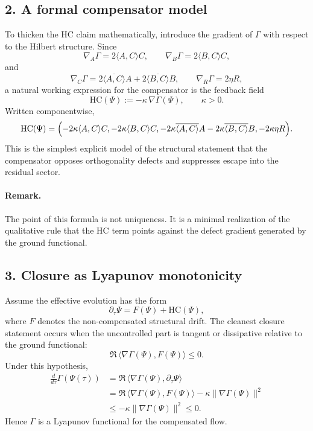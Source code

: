 \documentclass[12pt,a4paper]{article}
\begin{document}
\subsection*{2. A formal compensator model}
To thicken the HC claim mathematically, introduce the gradient of $\Gamma$ with
respect to the Hilbert structure. Since
\[
\nabla_A \Gamma = 2\langle A,C\rangle C,
\qquad
\nabla_B \Gamma = 2\langle B,C\rangle C,
\]
and
\[
\nabla_C \Gamma = 2\overline{\langle A,C\rangle}A + 2\overline{\langle B,C\rangle}B,
\qquad
\nabla_R \Gamma = 2\eta R,
\]
a natural working expression for the compensator is the feedback field
\[
\mathrm{HC}(\Psi) := -\kappa\,\nabla \Gamma(\Psi), \qquad \kappa>0.
\]
Written componentwise,
\[
\mathrm{HC}(\Psi) =
\Bigl(
-2\kappa\langle A,C\rangle C,
-2\kappa\langle B,C\rangle C,
-2\kappa\overline{\langle A,C\rangle}A -2\kappa\overline{\langle B,C\rangle}B,
-2\kappa\eta R
\Bigr).
\]
This is the simplest explicit model of the structural statement that the
compensator opposes orthogonality defects and suppresses escape into the
residual sector.

\paragraph{Remark.}
The point of this formula is not uniqueness. It is a minimal realization of the
qualitative rule that the HC term points against the defect gradient generated
by the ground functional.

\subsection*{3. Closure as Lyapunov monotonicity}
Assume the effective evolution has the form
\[
\partial_\tau \Psi = F(\Psi) + \mathrm{HC}(\Psi),
\]
where $F$ denotes the non-compensated structural drift. The cleanest closure
statement occurs when the uncontrolled part is tangent or dissipative relative
to the ground functional:
\[
\Re\,\langle \nabla\Gamma(\Psi),F(\Psi)\rangle \le 0.
\tag{T}
\]
Under this hypothesis,
\begin{align*}
\frac{d}{d\tau}\Gamma(\Psi(\tau))
&= \Re\,\langle \nabla\Gamma(\Psi),\partial_\tau\Psi\rangle \\
&= \Re\,\langle \nabla\Gamma(\Psi),F(\Psi)\rangle
 - \kappa\|\nabla\Gamma(\Psi)\|^2 \\
&\le -\kappa\|\nabla\Gamma(\Psi)\|^2 \le 0.
\end{align*}
Hence $\Gamma$ is a Lyapunov functional for the compensated flow.
\end{document}
